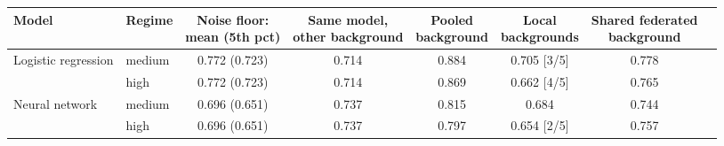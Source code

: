 \begin{tabular}{llcccccc}
\toprule
Model & Regime & \makecell{Noise floor:\\mean (5th pct)} & \makecell{Same model,\\other background} & \makecell{Pooled\\background} & \makecell{Local\\backgrounds} & \makecell{Shared federated\\background} \\
\midrule
Logistic regression & medium & 0.772 (0.723) & 0.714 & 0.884 & 0.705 [3/5] & 0.778 \\
 & high & 0.772 (0.723) & 0.714 & 0.869 & 0.662 [4/5] & 0.765 \\
\midrule
Neural network & medium & 0.696 (0.651) & 0.737 & 0.815 & 0.684 & 0.744 \\
 & high & 0.696 (0.651) & 0.737 & 0.797 & 0.654 [2/5] & 0.757 \\
\bottomrule
\end{tabular}
